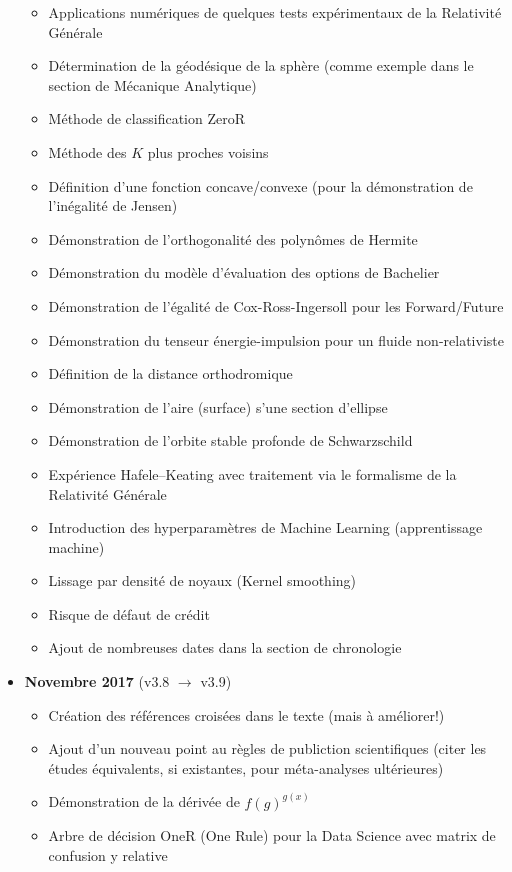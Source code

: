 \documentclass[12pt,a4paper,twoside,openright]{report}
\theoremstyle{definition}
\theoremstyle{itexmp}
\numberwithin{equation}{section}
\begin{document}
\begin{itemize}
\begin{itemize}[noitemsep]
				\item Applications numériques de quelques tests expérimentaux de la Relativité Générale
				\item Détermination de la géodésique de la sphère (comme exemple dans le section de Mécanique Analytique)
				\item Méthode de classification ZeroR
				\item Méthode des $K$ plus proches voisins
				\item Définition d'une fonction concave/convexe (pour la démonstration de l'inégalité de Jensen)
				\item Démonstration de l'orthogonalité des polynômes de Hermite
				\item Démonstration du modèle d'évaluation des options de Bachelier
				\item Démonstration de l'égalité de Cox-Ross-Ingersoll pour les Forward/Future
				\item Démonstration du tenseur énergie-impulsion pour un fluide non-relativiste
				\item Définition de la distance orthodromique
				\item Démonstration de l'aire (surface) s'une section d'ellipse
				\item Démonstration de l'orbite stable profonde de Schwarzschild
				\item Expérience Hafele–Keating avec traitement via le formalisme de la Relativité Générale
				\item Introduction des hyperparamètres de Machine Learning (apprentissage machine)
				\item Lissage par densité de noyaux (Kernel smoothing)
				\item Risque de défaut de crédit
				\item Ajout de nombreuses dates dans la section de chronologie
			\end{itemize}
		\item \textbf{Novembre 2017} (v3.8 $\rightarrow$ v3.9)
			\begin{itemize}[noitemsep]
				\item Création des références croisées dans le texte (mais à améliorer!)
				\item Ajout d'un nouveau point au règles de publiction scientifiques (citer les études équivalents, si existantes, pour méta-analyses ultérieures)
				\item Démonstration de la dérivée de $f(g)^{g(x)}$
				\item Arbre de décision OneR (One Rule) pour la Data Science avec matrix de confusion y relative

\end{itemize}
\end{itemize}
\end{document}
